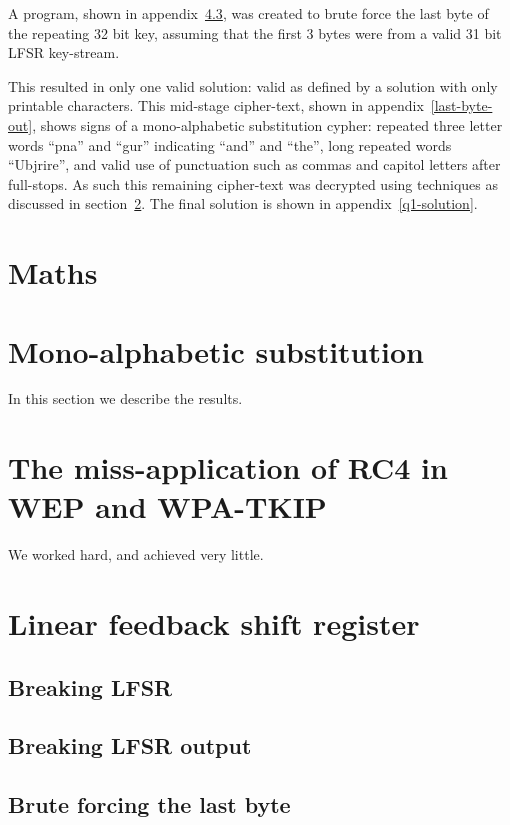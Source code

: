 \documentclass[pdftex, 12pt, a4paper]{article}
\begin{document}
A program, shown in appendix~\ref{last-byte}, was created to brute force the last byte of the repeating 32 bit key, assuming that the first 3 bytes were from a valid 31 bit LFSR key-stream.

This resulted in only one valid solution: valid as defined by a solution with only printable characters.  This mid-stage cipher-text, shown in appendix~\ref{last-byte-out}, shows signs of a mono-alphabetic substitution cypher: repeated three letter words ``pna'' and ``gur'' indicating ``and'' and ``the'', long repeated words ``Ubjrire'', and valid use of punctuation such as commas and capitol letters after full-stops. As such this remaining cipher-text was decrypted using techniques as discussed in section~\ref{mono}.  The final solution is shown in appendix~\ref{q1-solution}.

\section{Maths}

\section{Mono-alphabetic substitution}\label{mono}
In this section we describe the results\cite{stochastic-searching}.

\section{The miss-application of RC4 in WEP and WPA-TKIP}\label{conclusions}
We worked hard, and achieved very little.

\printbibliography

\appendices
\section{Linear feedback shift register}
\subsection{Breaking LFSR}\label{break-lfsr}

\pagebreak

\subsection{Breaking LFSR output}\label{break-lfsr-out}
\pagebreak

\subsection{Brute forcing the last byte}\label{last-byte}

\pagebreak
\end{document}
